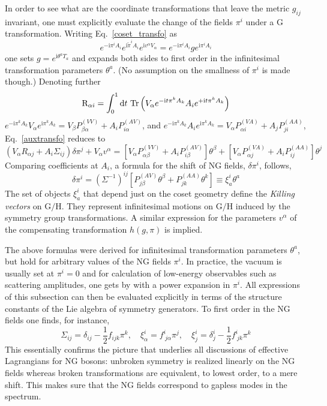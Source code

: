 \documentclass[final,2p,times,12pt,sort&compress]{elsarticle}
\newcommand\gr[1]{\mathrm{#1}}              %
\newcommand\R{\gr{R}}
\newcommand\imag{\mathrm i}                 %
\newcommand\vt{\theta}
\newcommand\dd{\mathop{{\rm d}\!}\nolimits} %
\DeclareMathOperator{\Tr}{Tr}
\begin{document}
In order to see what are the coordinate transformations that leave the metric
$g_{ij}$ invariant, one must explicitly evaluate the change of the fields
$\pi^i$ under a $\gr G$ transformation. Writing Eq.~\eqref{coset_transfo} as
\begin{equation}
e^{-\imag\pi^iA_i}e^{\imag\tilde\pi^iA_i}e^{\imag v^\alpha V_\alpha}=
e^{-\imag\pi^iA_i}ge^{\imag\pi^iA_i}
\label{auxtransfo}
\end{equation}
one sets $g=e^{\imag\vt^aT_a}$ and expands both sides to first order in the
infinitesimal transformation parameters $\vt^a$. (No assumption on the
smallness of $\pi^i$ is made though.) Denoting further
\begin{equation}
\R_{\alpha i}=\int_0^1\dd t\,\Tr\left(V_\alpha e^{-\imag t\pi^kA_k}A_i
e^{+\imag t\pi^kA_k}\right)
\end{equation}
$e^{-\imag\pi^kA_k}V_\alpha e^{\imag\pi^kA_k}=V_\beta P^{(VV)}_{\beta\alpha}+
A_iP^{(AV)}_{i\alpha}$, and $e^{-\imag\pi^kA_k}A_i
e^{\imag\pi^kA_k}=V_\alpha P^{(VA)}_{\alpha i}+A_jP^{(AA)}_{ji}$,
Eq.~\eqref{auxtransfo} reduces to
\begin{equation}
(V_\alpha R_{\alpha j}+A_i\Sigma_{ij})\delta\pi^j+V_\alpha v^\alpha=
\left[V_\alpha P^{(VV)}_{\alpha\beta}+A_iP^{(AV)}_{i\beta}\right]\vt^\beta+
\left[V_\alpha P^{(VA)}_{\alpha j}+A_iP^{(AA)}_{ij}\right]\vt^j
\label{master_pi}
\end{equation}
Comparing coefficients at $A_i$, a formula for the shift of NG fields,
$\delta\pi^i$, follows,
\begin{equation}
\delta\pi^i=(\Sigma^{-1})^{ij}\left[P^{(AV)}_{j\beta}\vt^\beta+P^{(AA)}_{jk}\vt^k\right]
\equiv\xi^i_{a}\vt^a
\label{killing}
\end{equation}
The set of objects $\xi^i_a$ that depend just on the coset geometry define the
\emph{Killing vectors} on $\gr{G/H}$. They represent infinitesimal motions on
$\gr{G/H}$ induced by the symmetry group transformations. A similar
expression for the parameters $v^\alpha$ of the compensating transformation
$h(g,\pi)$ is implied.

The above formulas were derived for infinitesimal transformation parameters
$\vt^a$, but hold for arbitrary values of the NG fields $\pi^i$. In practice,
the vacuum is usually set at $\pi^i=0$ and for calculation of low-energy
observables such as scattering amplitudes, one gets by with a power expansion
in $\pi^i$. All expressions of this subsection can then be evaluated explicitly
in terms of the structure constants of the Lie algebra of symmetry generators.
To first order in the NG fields one finds, for instance,
\begin{equation}
\Sigma_{ij}=\delta_{ij}-\frac12f_{ijk}\pi^k,\quad
\xi^i_\alpha=f^i_{\ j\alpha}\pi^j,\quad
\xi^i_j=\delta^i_j-\frac12f^i_{\ jk}\pi^k
\end{equation}
This essentially confirms the picture that underlies all discussions of
effective Lagrangians for NG bosons: unbroken symmetry is realized linearly on
the NG fields whereas broken transformations are equivalent, to lowest order,
to a mere shift. This makes sure that the NG fields correspond to gapless modes
in the spectrum.
\end{document}
